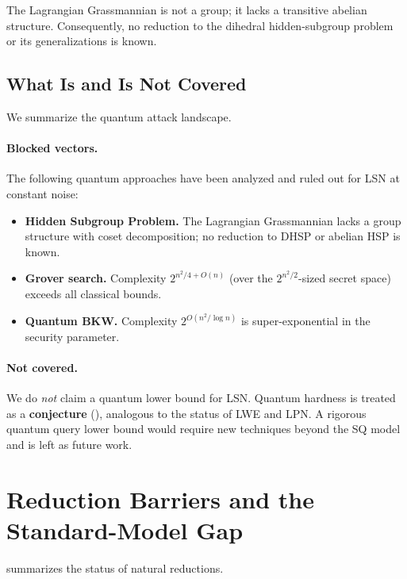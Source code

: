 \documentclass[11pt,a4paper]{article}
\theoremstyle{plain}
\theoremstyle{definition}
\begin{document}
The Lagrangian Grassmannian is not a group; it lacks a transitive abelian structure. Consequently, no reduction to the dihedral hidden-subgroup problem or its generalizations is known.

\subsection{What Is and Is Not Covered}
\label{subsec:quantum-covered}

We summarize the quantum attack landscape.

\paragraph{Blocked vectors.} The following quantum approaches have been analyzed and ruled out for LSN at constant noise:
\begin{itemize}
\item \textbf{Hidden Subgroup Problem.} The Lagrangian Grassmannian lacks a group structure with coset decomposition; no reduction to DHSP or abelian HSP is known.
\item \textbf{Grover search.} Complexity $2^{n^2/4 + O(n)}$ (over the $2^{n^2/2}$-sized secret space) exceeds all classical bounds.
\item \textbf{Quantum BKW.} Complexity $2^{O(n^2 / \log n)}$ is super-exponential in the security parameter.
\end{itemize}

\paragraph{Not covered.} We do \emph{not} claim a quantum lower bound for LSN. Quantum hardness is treated as a \textbf{conjecture} (), analogous to the status of LWE and LPN. A rigorous quantum query lower bound would require new techniques beyond the SQ model and is left as future work.

\section{Reduction Barriers and the Standard-Model Gap}
\label{sec:barriers}

 summarizes the status of natural reductions.
\end{document}
